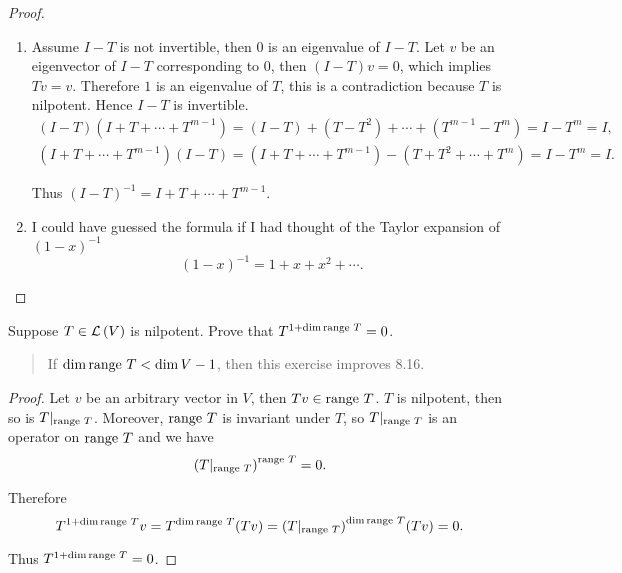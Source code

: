 \begin{proof}
    \begin{enumerate}[label={(\alph*)}]
        \item Assume $I - T$ is not invertible, then $0$ is an eigenvalue of $I - T$. Let $v$ be an eigenvector of $I - T$ corresponding to $0$, then $(I - T)v = 0$, which implies $Tv = v$. Therefore $1$ is an eigenvalue of $T$, this is a contradiction because $T$ is nilpotent. Hence $I - T$ is invertible.
              \[
                  \begin{split}
                      (I - T)(I + T + \cdots + T^{m-1}) = (I - T) + (T - T^{2}) + \cdots + (T^{m-1} - T^{m}) = I - T^{m} = I, \\
                      (I + T + \cdots + T^{m-1})(I - T) = (I + T + \cdots + T^{m-1}) - (T + T^{2} + \cdots + T^{m}) = I - T^{m} = I.
                  \end{split}
              \]

              Thus ${(I - T)}^{-1} = I + T + \cdots + T^{m-1}$.
        \item I could have guessed the formula if I had thought of the Taylor expansion of ${(1 - x)}^{-1}$
              \[
                  {(1 - x)}^{-1} = 1 + x + x^{2} + \cdots.
              \]
    \end{enumerate}
\end{proof}
\newpage

\begin{exercise}\label{chapter8:sectionA:exercise18}
    Suppose $T\in\mathcal{L}\left({V}\right)$ is nilpotent. Prove that $T^{1 + \dim\operatorname{range}\,{T}} = 0$.
\end{exercise}

\begin{quote}
    If $\dim\operatorname{range}\,{T} < \dim V - 1$, then this exercise improves 8.16.
\end{quote}

\begin{proof}
    Let $v$ be an arbitrary vector in $V$, then $Tv\in\operatorname{range}\,{T}$. $T$ is nilpotent, then so is $T\vert_{\operatorname{range}\,{T}}$. Moreover, $\operatorname{range}\,{T}$ is invariant under $T$, so $T\vert_{\operatorname{range}\,{T}}$ is an operator on $\operatorname{range}\,{T}$ and we have
    \[
        {(T\vert_{\operatorname{range}\,{T}})}^{\operatorname{range}\,{T}} = 0.
    \]

    Therefore
    \[
        T^{1 + \dim\operatorname{range}\,{T}}v = T^{\dim\operatorname{range}\,{T}}(Tv) = {(T\vert_{\operatorname{range}\,{T}})}^{\dim\operatorname{range}\,{T}}(Tv) = 0.
    \]

    Thus $T^{1 + \dim\operatorname{range}\,{T}} = 0$.
\end{proof}
\newpage

